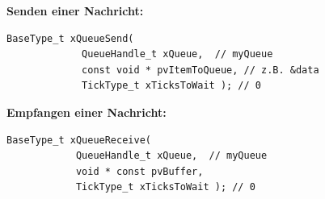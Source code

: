 \documentclass[
    fontsize=12pt,                      %
    paper=a4,                           %
    twoside=off,                       %
    DIV=15,                             %
    BCOR=12mm,                          %
    headings=normal,                    %
    headsepline=false,                   %
    footsepline=false,                  %
    headinclude=true,                   %
    footinclude=false,                  %
    toc=listof,                         %
    toc=bib,                            %
    chapterprefix=false,                %
    appendixprefix=false,               %
    numbers=noendperiod,                %
    captions=tableabove,                %
    footnotes=multiple,                 %
    bibliography=oldstyle,              %
    draft=false,                        %
]{scrreprt}
\begin{document}
\vskip 1cm
\textbf{Senden einer Nachricht:}
\begin{lstlisting}[frame=single,  label=LST_MyCam]
BaseType_t xQueueSend( 
             QueueHandle_t xQueue,  // myQueue
             const void * pvItemToQueue, // z.B. &data
             TickType_t xTicksToWait ); // 0
\end{lstlisting}

\vskip 1cm
\textbf{Empfangen einer Nachricht:}
\begin{lstlisting}[frame=single,  label=LST_MyCam]
BaseType_t xQueueReceive( 
        	QueueHandle_t xQueue,  // myQueue
        	void * const pvBuffer,
        	TickType_t xTicksToWait ); // 0
\end{lstlisting}
\end{document}
